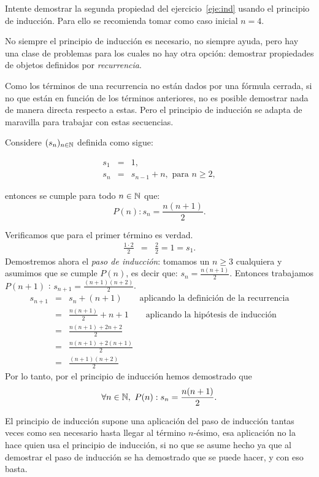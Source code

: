 \begin{ejercicio}
Intente demostrar la segunda propiedad del ejercicio~\ref{eje:ind} usando el principio de inducción. Para ello se recomienda tomar como caso inicial $n=4$.
\end{ejercicio}

No siempre el principio de inducción es necesario, no siempre ayuda, pero hay una clase de problemas para los cuales no hay otra opción: demostrar propiedades de objetos definidos por \emph{recurrencia}.

Como los términos de una recurrencia no están dados por una fórmula cerrada, si no que están en función de los términos anteriores, no es posible demostrar nada de manera directa respecto a estas. Pero el principio de inducción se adapta de maravilla para trabajar con estas secuencias.

\medskip

\begin{ejemplo}\label{eje:sn}
Considere $(s_n)_{n\in\mathbb{N}}$ definida como sigue:

\begin{eqnarray*}
s_1&=&1,\\
s_n&=&s_{n-1}+n,\textrm{ para }n\ge2,
\end{eqnarray*}

entonces se cumple para todo $n\in\mathbb{N}$ que:
$$P(n): s_n=\frac{n(n+1)}{2}.$$

Verificamos que para el primer término es verdad.
\begin{eqnarray*}
\frac{1\cdot2}{2}&=&\frac{2}{2}=1=s_1.
\end{eqnarray*}
Demostremos ahora el \emph{paso de inducción}: tomamos un $n\ge3$ cualquiera y asumimos que se cumple $P(n)$, es decir que: $s_n=\frac{n(n+1)}{2}$.
Entonces trabajamos $P(n+1)$ : $s_{n+1}=\frac{(n+1)(n+2)}{2}$.
\begin{eqnarray*}
s_{n+1}&=&s_n+(n+1) \qquad\textrm{aplicando la definición de la recurrencia}\\
&=&\frac{n(n+1)}{2}+n+1 \qquad\textrm{aplicando la hipótesis de inducción}\\
&=&\frac{n(n+1)+2n+2}{2}\\
&=&\frac{n(n+1)+2(n+1)}{2}\\
&=&\frac{(n+1)(n+2)}{2}
\end{eqnarray*}
Por lo tanto, por el principio de inducción hemos demostrado que 
$$\forall n\in\N,\ P(n):s_n=\frac{n(n+1)}{2}.$$
\end{ejemplo}

El principio de inducción supone una aplicación del paso de inducción tantas veces como sea necesario hasta llegar al término $n$-ésimo, esa aplicación no la hace quien usa el principio de inducción, si no que se asume hecho ya que al demostrar el paso de inducción se ha demostrado que se puede hacer, y con eso basta.


